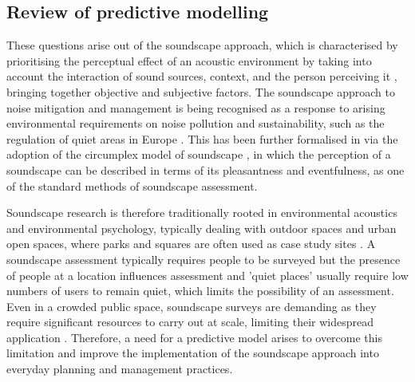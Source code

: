  \subsection{Review of predictive modelling}
 These questions arise out of the soundscape approach, which is characterised by prioritising the perceptual effect of an acoustic environment by taking into account the interaction of sound sources, context, and the person perceiving it \citep{ISO12913Part1,Truax1999Handbook}, bringing together objective and subjective factors. The soundscape approach to noise mitigation and management is being recognised as a response to arising environmental requirements on noise pollution and sustainability, such as the regulation of quiet areas in Europe \citep{EEA2020Environmental, Aletta2018Towards,Radicchi2021Sound}. This has been further formalised in \citet{ISO12913Part2} via the adoption of the circumplex model of soundscape \citep{Axelsson2010principal}, in which the perception of a soundscape can be described in terms of its pleasantness and eventfulness, as one of the standard methods of soundscape assessment.

 Soundscape research is therefore traditionally rooted in environmental acoustics and environmental psychology, typically dealing with outdoor spaces \citep{Torresin2020Indoor} and urban open spaces, where parks and squares are often used as case study sites \citep{Kang2007Urban}. A soundscape assessment typically requires people to be surveyed but the presence of people at a location influences assessment \citep{Aletta2018Towards} and 'quiet places' usually require low numbers of users to remain quiet, which limits the possibility of an assessment. Even in a crowded public space, soundscape surveys are demanding as they require significant resources to carry out at scale, limiting their widespread application \citep{Mitchell2020Soundscape}. Therefore, a need for a predictive model arises to overcome this limitation and improve the implementation of the soundscape approach into everyday planning and management practices.

